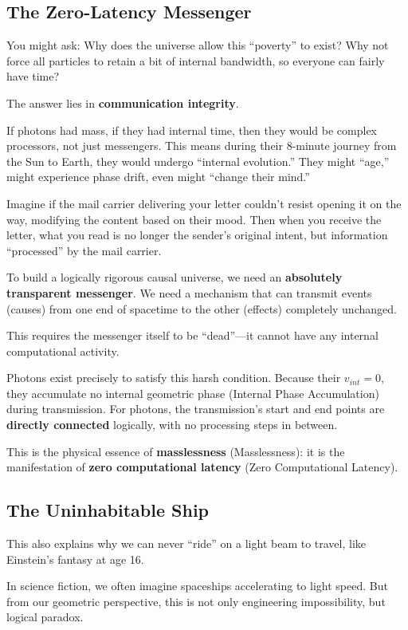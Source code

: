\subsection{The Zero-Latency Messenger}

You might ask: Why does the universe allow this ``poverty'' to exist? Why not force all particles to retain a bit of internal bandwidth, so everyone can fairly have time?

The answer lies in \textbf{communication integrity}.

If photons had mass, if they had internal time, then they would be complex processors, not just messengers. This means during their 8-minute journey from the Sun to Earth, they would undergo ``internal evolution.'' They might ``age,'' might experience phase drift, even might ``change their mind.''

Imagine if the mail carrier delivering your letter couldn't resist opening it on the way, modifying the content based on their mood. Then when you receive the letter, what you read is no longer the sender's original intent, but information ``processed'' by the mail carrier.

To build a logically rigorous causal universe, we need an \textbf{absolutely transparent messenger}. We need a mechanism that can transmit events (causes) from one end of spacetime to the other (effects) completely unchanged.

This requires the messenger itself to be ``dead''---it cannot have any internal computational activity.

Photons exist precisely to satisfy this harsh condition. Because their $v_{int}=0$, they accumulate no internal geometric phase (Internal Phase Accumulation) during transmission. For photons, the transmission's start and end points are \textbf{directly connected} logically, with no processing steps in between.

This is the physical essence of \textbf{masslessness} (Masslessness): it is the manifestation of \textbf{zero computational latency} (Zero Computational Latency).

\subsection{The Uninhabitable Ship}

This also explains why we can never ``ride'' on a light beam to travel, like Einstein's fantasy at age 16.

In science fiction, we often imagine spaceships accelerating to light speed. But from our geometric perspective, this is not only engineering impossibility, but logical paradox.

